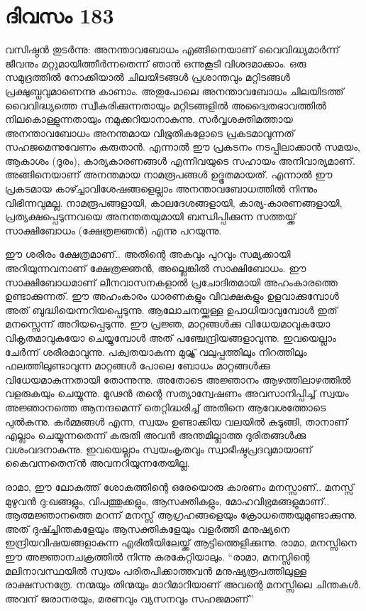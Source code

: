 \section{ദിവസം 183}


വസിഷ്ഠൻ തുടർന്നു: അനന്താവബോധം എങ്ങിനെയാണ്‌ വൈവിദ്ധ്യമാർന്ന് ജീവനും മറ്റുമായിത്തീർന്നതെന്ന് ഞാൻ ഒന്നുകൂടി വിശദമാക്കാം. ഒരു സമുദ്രത്തിൽ നോക്കിയാൽ ചിലയിടങ്ങൾ പ്രശാന്തവും മറ്റിടങ്ങൾ പ്രക്ഷുബ്ധവുമാണെന്നു കാണാം. അതുപോലെ അനന്താവബോധം ചിലയിടത്ത് വൈവിദ്ധ്യത്തെ സ്വീകരിക്കുന്നതായും മറ്റിടങ്ങളിൽ അദ്വൈതഭാവത്തിൽ നിലകൊള്ളുന്നതായും നമുക്കറിയാനാകുന്നു. സർവ്വശക്തിമത്തായ അനന്താവബോധം അനന്തമായ വിഭൂതികളോടെ പ്രകടമാവുന്നത് സഹജമെന്നുവേണം കരുതാൻ. എന്നാൽ ഈ പ്രകടനം നടപ്പിലാക്കാൻ സമയം, ആകാശം (ദൂരം), കാര്യകാരണങ്ങൾ എന്നിവയുടെ സഹായം അനിവാര്യമാണ്‌.  അങ്ങിനെയാണ്‌ അനന്തമായ നാമരൂപങ്ങൾ ഉദ്ഭൂതമായത്. എന്നാൽ ഈ പ്രകടമായ കാഴ്ച്ചാവിശേഷങ്ങളെല്ലാം അനന്താവബോധത്തിൽ നിന്നും വിഭിന്നവുമല്ല. നാമരൂപങ്ങളായി, കാലദേശങ്ങളായി, കാര്യ-കാരണങ്ങളായി, പ്രത്യക്ഷപ്പെടുന്നവയെ അനന്തതയുമായി ബന്ധിപ്പിക്കുന്ന സത്തയ്ക്ക് സാക്ഷിബോധം (ക്ഷേത്രജ്ഞൻ) എന്നു പറയുന്നു.

ഈ ശരീരം ക്ഷേത്രമാണ്‌..  അതിന്റെ അകവും പുറവും സമ്യക്കായി അറിയുന്നവനാണ് ക്ഷേത്രജ്ഞൻ, അല്ലെങ്കിൽ സാക്ഷിബോധം. ഈ സാക്ഷിബോധമാണ്‌ ലീനവാസനകളാൽ പ്രചോദിതമായി അഹംകാരത്തെ ഉണ്ടാക്കുന്നത്. ഈ അഹംകാരം ധാരണകളും വിവക്ഷകളും ഉളവാക്കുമ്പോൾ അത് ബുദ്ധിയെന്നറിയപ്പെടുന്നു. ആലോചനയ്ക്കുള്ള ഉപാധിയാവുമ്പോൾ ഇത് മനസ്സെന്ന് അറിയപ്പെടുന്നു. ഈ പ്രജ്ഞ, മാറ്റങ്ങൾക്കു വിധേയമാവുകയോ വികൃതമാവുകയോ ചെയ്യുമ്പോൾ അത് പഞ്ചേന്ദ്രിയങ്ങളാവുന്നു. ഇവയെല്ലാം ചേർന്ന് ശരീരമാവുന്നു. പക്വതയാകുന്ന മുറ്യ്ക്ക് വലുപ്പത്തിലും നിറത്തിലും ഫലത്തിലുണ്ടാവുന്ന മാറ്റങ്ങൾ പോലെ ബോധം മാറ്റങ്ങൾക്കു വിധേയമാകുന്നതായി തോന്നുന്നു. അതോടെ അജ്ഞാനം ആഴത്തിലാഴത്തിൽ വളരുകയും ചെയ്യുന്നു. മൂഢൻ തന്റെ സത്യാന്വേഷണം അവസാനിപ്പിച്ച് സ്വയം അജ്ഞാനത്തെ ആനന്ദമെന്ന് തെറ്റിദ്ധരിച്ച് അതിനെ ആവേശത്തോടെ പുല്‍കുന്നു. കര്‍മ്മങ്ങള്‍ എന്ന, സ്വയം ഉണ്ടാക്കിയ വലയിൽ കുടുങ്ങി, താനാണ്‌ എല്ലാം ചെയ്യുന്നതെന്ന് കരുതി അവന്‍ അന്തമില്ലാത്ത ദുരിതങ്ങൾക്കു വശംവദനാകുന്നു. ഇവയെല്ലാം സ്വയംകൃതവും സ്വാഭീഷ്ടപ്രദവുമായാണ്‌ കൈവന്നതെന്ന്‍  അവനറിയുന്നതേയില്ല.

രാമാ, ഈ ലോകത്ത് ശോകത്തിന്റെ ഒരേയൊരു കാരണം മനസ്സാണ്‌.. മനസ്സ് മുഴുവൻ ദു:ഖങ്ങളും, വിപത്തുക്കളും, ആസക്തികളും, മോഹവിഭ്രമങ്ങളുമാണ്‌.. ആത്മജ്ഞാനത്തെ മറന്ന് മനസ്സ് ആഗ്രഹങ്ങളെയും ക്രോധത്തെയുമുണ്ടാക്കുന്നു. അത് ദുഷ്ച്ചിന്തകളേയും ആസക്തികളേയും വളർത്തി മനുഷ്യനെ ഇന്ദ്രിയവിഷയങ്ങളാകുന്ന എരിതീയിലേയ്ക്ക് ആട്ടിത്തെളിക്കുന്നു. രാമാ, മനസ്സിനെ ഈ അജ്ഞാനചക്രത്തിൽ നിന്നു കരകേറ്റിയാലും. “രാമാ, മനസ്സിന്റെ മലിനാവസ്ഥയിൽ സ്വയം പരിതപിക്കാത്തവൻ മനുഷ്യരൂപത്തിലുള്ള രാക്ഷസനത്രേ. നന്മയും തിന്മയും മാറിമാറിയാണ്‌ അവന്റെ മനസ്സിലെ ചിന്തകൾ. അവന്‌ ജരാനരയും, മരണവും വ്യസനവും സഹജമാണ്‌” 

